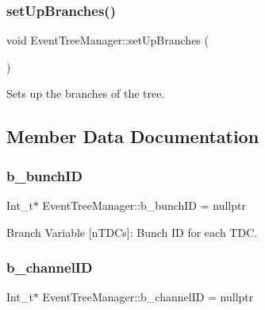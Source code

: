 \subsubsection{\texorpdfstring{set\+Up\+Branches()}{setUpBranches()}}
{\footnotesize\ttfamily void Event\+Tree\+Manager\+::set\+Up\+Branches (\begin{DoxyParamCaption}{ }\end{DoxyParamCaption})\hspace{0.3cm}{\ttfamily [private]}}



Sets up the branches of the tree. 



\subsection{Member Data Documentation}
\mbox{\label{class_event_tree_manager_af058bf8cb0ba8ec529ade0af79fe1678}} 
\subsubsection{\texorpdfstring{b\+\_\+bunch\+ID}{b\_bunchID}}
{\footnotesize\ttfamily Int\+\_\+t$\ast$ Event\+Tree\+Manager\+::b\+\_\+bunch\+ID = nullptr\hspace{0.3cm}{\ttfamily [private]}}



Branch Variable \mbox{[}n\+T\+D\+Cs\mbox{]}\+: Bunch ID for each T\+DC. 

\mbox{\label{class_event_tree_manager_a2bb8b2f71311b73c3003b039cb31833d}} 
\subsubsection{\texorpdfstring{b\+\_\+channel\+ID}{b\_channelID}}
{\footnotesize\ttfamily Int\+\_\+t$\ast$ Event\+Tree\+Manager\+::b\+\_\+channel\+ID = nullptr\hspace{0.3cm}{\ttfamily [private]}}



